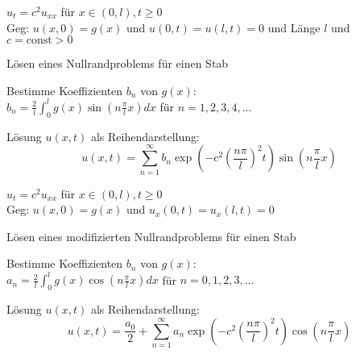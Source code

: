 \documentclass[german,color,5pt]{latex4ei/latex4ei_fs}
\begin{document}
\begin{sectionbox}
	\(u_{t}=c^{2}u_{xx}\) für \(x \in (0,l), t\geq 0\) \\
	Geg: \(u(x,0)=g(x)\) und \(u(0,t)=u(l,t)=0\) und Länge \(l\) und \(c=\mathrm{const}>0\)
	\begin{cookbox}{Lösen eines Nullrandproblems für einen Stab}
		\item Bestimme Koeffizienten \(b_{n}\) von \(g(x)\): \\
		\(b_{n}=\frac{2}{l} \int_{0}^{l} g(x)\sin\left(n\frac{\pi}{l}x\right)dx\) \qquad für \(n=1,2,3,4,... \)
		\item Lösung \(u(x,t)\) als Reihendarstellung: \vspace{-5pt}		 %
		\[u(x,t)=\sum_{n=1}^{\infty} b_{n} \exp\left(-c^{2}\left(\frac{n\pi}{l}\right)^{2}t\right)\sin\left(n\frac{\pi}{l}x\right)\]
	\end{cookbox}
	\(u_{t}=c^{2}u_{xx}\) für \(x \in (0,l), t\geq 0\) \\
	Geg: \(u(x,0)=g(x)\) und \(u_x(0,t)=u_x(l,t)=0\)
	\begin{cookbox}{Lösen eines modifizierten Nullrandproblems für einen Stab}
		\item Bestimme Koeffizienten \(b_{n}\) von \(g(x)\): \\
		\(a_{n}=\frac{2}{l} \int_{0}^{l} g(x)\cos\left(n\frac{\pi}{l}x\right)dx\) \qquad für \(n=0,1,2,3,... \)
		\item Lösung \(u(x,t)\) als Reihendarstellung: \vspace{-5pt}		 %
		\[u(x,t)=\frac{a_0}{2} + \sum_{n=1}^{\infty} a_{n} \exp\left(-c^{2}\left(\frac{n\pi}{l}\right)^{2}t\right)\cos\left(n\frac{\pi}{l}x\right)\]
	\end{cookbox}
\end{sectionbox}

\end{document}

